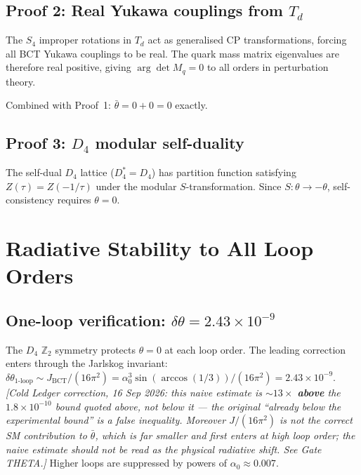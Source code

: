 \documentclass[review,number,sort&compress]{elsarticle}
\newcommand{\azero}{\alpha_0}
\newcommand{\thetabar}{\bar{\theta}}
\newcommand{\Td}{T_d}
\newcommand{\Dfour}{D_4}
\begin{document}
\subsection{Proof 2: Real Yukawa couplings from $\Td$}

The $S_4$ improper rotations in $\Td$ act as generalised CP transformations,
forcing all BCT Yukawa couplings to be real. The quark mass matrix
eigenvalues are therefore real positive, giving $\arg\det M_q = 0$ to all
orders in perturbation theory.

Combined with Proof~1: $\thetabar = 0 + 0 = 0$ exactly.

\subsection{Proof 3: $\Dfour$ modular self-duality}

The self-dual $\Dfour$ lattice ($D_4^* = D_4$) has partition function
satisfying $Z(\tau) = Z(-1/\tau)$ under the modular $S$-transformation.
Since $S: \theta \to -\theta$, self-consistency requires $\theta = 0$.

\section{Radiative Stability to All Loop Orders}
\label{sec:strongCP_stability}

\subsection{One-loop verification: $\delta\theta = 2.43 \times 10^{-9}$}

The $D_4$ $\mathbb{Z}_2$ symmetry protects $\theta = 0$ at each loop order.
The leading correction enters through the Jarlskog invariant:
$\delta\theta_{1\text{-loop}} \sim J_{\mathrm{BCT}}/(16\pi^2)
= \azero^3 \sin(\arccos(1/3))/(16\pi^2) = 2.43 \times 10^{-9}$.
\emph{[Cold Ledger correction, 16 Sep 2026: this naive estimate is
$\sim\!13\times$ \textbf{above} the $1.8\times10^{-10}$ bound quoted above,
not below it --- the original ``already below the experimental bound'' is a
false inequality. Moreover $J/(16\pi^2)$ is not the correct SM contribution to
$\thetabar$, which is far smaller and first enters at high loop order; the naive
estimate should not be read as the physical radiative shift. See Gate THETA.]}
Higher loops are suppressed by powers of $\azero \approx 0.007$.
\end{document}
